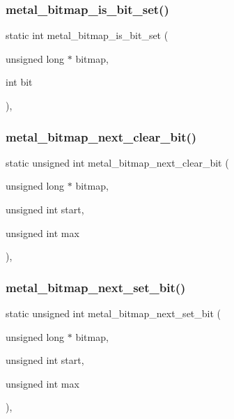\subsubsection{\texorpdfstring{metal\+\_\+bitmap\+\_\+is\+\_\+bit\+\_\+set()}{metal\_bitmap\_is\_bit\_set()}}
{\footnotesize\ttfamily static int metal\+\_\+bitmap\+\_\+is\+\_\+bit\+\_\+set (\begin{DoxyParamCaption}\item[{unsigned long $\ast$}]{bitmap,  }\item[{int}]{bit }\end{DoxyParamCaption})\hspace{0.3cm}{\ttfamily [inline]}, {\ttfamily [static]}}

\mbox{\label{group__utilities_gadc1fed2eca21c2c0435feca5a734f816}} 
\subsubsection{\texorpdfstring{metal\+\_\+bitmap\+\_\+next\+\_\+clear\+\_\+bit()}{metal\_bitmap\_next\_clear\_bit()}}
{\footnotesize\ttfamily static unsigned int metal\+\_\+bitmap\+\_\+next\+\_\+clear\+\_\+bit (\begin{DoxyParamCaption}\item[{unsigned long $\ast$}]{bitmap,  }\item[{unsigned int}]{start,  }\item[{unsigned int}]{max }\end{DoxyParamCaption})\hspace{0.3cm}{\ttfamily [inline]}, {\ttfamily [static]}}

\mbox{\label{group__utilities_gad10cd8f0c0300e70f9bba357dbee6c77}} 
\subsubsection{\texorpdfstring{metal\+\_\+bitmap\+\_\+next\+\_\+set\+\_\+bit()}{metal\_bitmap\_next\_set\_bit()}}
{\footnotesize\ttfamily static unsigned int metal\+\_\+bitmap\+\_\+next\+\_\+set\+\_\+bit (\begin{DoxyParamCaption}\item[{unsigned long $\ast$}]{bitmap,  }\item[{unsigned int}]{start,  }\item[{unsigned int}]{max }\end{DoxyParamCaption})\hspace{0.3cm}{\ttfamily [inline]}, {\ttfamily [static]}}

